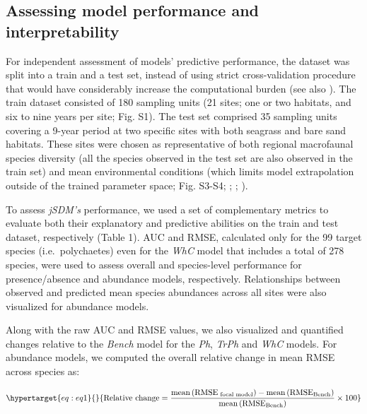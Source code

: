 \documentclass[9pt,biorxiv,doublespacing,lineno]{lapreprint}
\begin{document}
\hypertarget{assessing-model-performance-and-interpretability}{%
\subsection{Assessing model performance and
interpretability}\label{assessing-model-performance-and-interpretability}}

For independent assessment of models' predictive performance, the
dataset was split into a train and a test set, instead of using strict
cross-validation procedure that would have considerably increase the
computational burden (see also \textcite{Norberg_2019}). The train
dataset consisted of 180 sampling units (21 sites; one or two habitats,
and six to nine years per site; Fig. S1). The test set comprised 35
sampling units covering a 9-year period at two specific sites with both
seagrass and bare sand habitats. These sites were chosen as
representative of both regional macrofaunal species diversity (all the
species observed in the test set are also observed in the train set) and
mean environmental conditions (which limits model extrapolation outside
of the trained parameter space; Fig. S3-S4; \textcite{Boye_2017} ;
\textcite{Boye_2022} ; \textcite{Toumi_2023}).

To assess \emph{jSDM's} performance, we used a set of complementary
metrics to evaluate both their explanatory and predictive abilities on
the train and test dataset, respectively (Table 1). AUC and RMSE,
calculated only for the 99 target species (i.e.~polychaetes) even for
the \emph{WhC} model that includes a total of 278 species, were used to
assess overall and species-level performance for presence/absence and
abundance models, respectively. Relationships between observed and
predicted mean species abundances across all sites were also visualized
for abundance models.

Along with the raw AUC and RMSE values, we also visualized and
quantified changes relative to the \emph{Bench} model for the \emph{Ph},
\emph{TrPh} and \emph{WhC} models. For abundance models, we computed the
overall relative change in mean RMSE across species as:

\begin{equation}\protect\hypertarget{eq:eq1}{}{\text{Relative change} = \frac{\text{mean}\left(\text{RMSE}_{\text{ focal model}}\right) - \text{mean}\left(\text{RMSE}_{\text{Bench}}\right)}{\text{mean}\left(\text{RMSE}_{\text{Bench}}\right)} \times 100}\label{eq:eq1}\end{equation}
\end{document}
